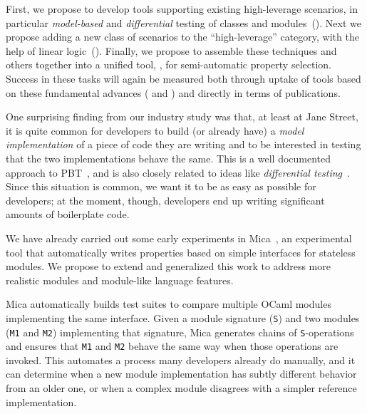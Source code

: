 First, we
propose to develop tools
supporting existing high-leverage scenarios, in particular {\em
model-based} and {\em differential} testing of classes and
modules~(). Next we propose
adding a new class of scenarios to the ``high-leverage'' category, with the
help of linear logic~(). Finally, we propose
to assemble these
techniques and others together into a unified tool, {\em \GhostChat}, for
semi-automatic property selection.
%
Success in these tasks will again be measured both through
uptake of
tools based on these fundamental advances ( and
) and directly in terms of publications.

%
One surprising finding from our industry study was that, at least at
Jane Street,
it is quite common for developers to build (or already have) a {\em
model implementation} of a piece of code they are writing and to be
interested in testing that the two
implementations behave the same.  This is a well documented approach to
PBT~\cite{hughes_experiences_2016}, and is also closely related to ideas like
{\em differential testing}~\cite{mckeeman1998differential}.
%
Since this situation is common, we want it to be as easy as possible
for developers; at the moment, though, developers end up writing
significant amounts of boilerplate code.

We have already carried out some early experiments in
Mica~\cite{Ng2023MicaPoster}, an experimental tool that automatically
writes properties based on simple interfaces for stateless modules.
We propose to extend and generalized this work to address more
realistic modules and module-like language features.


Mica automatically builds test suites to compare multiple OCaml
modules implementing the same interface. Given a module signature
(\lstinline{S}) and two modules
(\lstinline{M1} and \lstinline{M2}) implementing that signature, Mica
generates chains of \lstinline{S}-operations and ensures that
\lstinline{M1} and \lstinline{M2} behave the same way when those operations are
invoked. This automates a process many developers already do manually,
and it can
determine when a new module implementation has subtly different
behavior from an older one, or when a
complex module disagrees with a simpler reference implementation.

